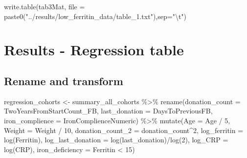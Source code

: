 \documentclass[
]{article}
\newenvironment{Shaded}{\begin{snugshade}}{\end{snugshade}}
\newcommand{\AttributeTok}[1]{\textcolor[rgb]{0.77,0.63,0.00}{#1}}
\newcommand{\DecValTok}[1]{\textcolor[rgb]{0.00,0.00,0.81}{#1}}
\newcommand{\FunctionTok}[1]{\textcolor[rgb]{0.00,0.00,0.00}{#1}}
\newcommand{\NormalTok}[1]{#1}
\newcommand{\OtherTok}[1]{\textcolor[rgb]{0.56,0.35,0.01}{#1}}
\newcommand{\SpecialCharTok}[1]{\textcolor[rgb]{0.00,0.00,0.00}{#1}}
\newcommand{\StringTok}[1]{\textcolor[rgb]{0.31,0.60,0.02}{#1}}
\begin{document}
\begin{Shaded}
\begin{Highlighting}[]
  \FunctionTok{write.table}\NormalTok{(tab3Mat, }
              \AttributeTok{file =} \FunctionTok{paste0}\NormalTok{(}\StringTok{"../results/low\_ferritin\_data/table\_1.txt"}\NormalTok{),}\AttributeTok{sep=}\StringTok{"}\SpecialCharTok{\textbackslash{}t}\StringTok{"}\NormalTok{)}
\end{Highlighting}
\end{Shaded}

\hypertarget{results---regression-table}{%
\section{Results - Regression table}\label{results---regression-table}}

\hypertarget{rename-and-transform}{%
\subsection{Rename and transform}\label{rename-and-transform}}

\begin{Shaded}
\begin{Highlighting}[]
\NormalTok{regression\_cohorts }\OtherTok{\textless{}{-}}\NormalTok{ summary\_all\_cohorts }\SpecialCharTok{\%\textgreater{}\%} 
    \FunctionTok{rename}\NormalTok{(}\AttributeTok{donation\_count =}\NormalTok{ TwoYearsFromStartCount\_FB,}
            \AttributeTok{last\_donation =}\NormalTok{ DaysToPreviousFB,}
            \AttributeTok{iron\_complience =}\NormalTok{ IronComplienceNumeric) }\SpecialCharTok{\%\textgreater{}\%} 
     \FunctionTok{mutate}\NormalTok{(}\AttributeTok{Age =}\NormalTok{ Age }\SpecialCharTok{/} \DecValTok{5}\NormalTok{, }
            \AttributeTok{Weight =}\NormalTok{ Weight }\SpecialCharTok{/} \DecValTok{10}\NormalTok{,}
            \AttributeTok{donation\_count\_2 =}\NormalTok{ donation\_count}\SpecialCharTok{\^{}}\DecValTok{2}\NormalTok{,}
            \AttributeTok{log\_ferritin =} \FunctionTok{log}\NormalTok{(Ferritin),}
            \AttributeTok{log\_last\_donation =} \FunctionTok{log}\NormalTok{(last\_donation)}\SpecialCharTok{/}\FunctionTok{log}\NormalTok{(}\DecValTok{2}\NormalTok{),}
            \AttributeTok{log\_CRP =} \FunctionTok{log}\NormalTok{(CRP),}
            \AttributeTok{iron\_deficiency =}\NormalTok{ Ferritin }\SpecialCharTok{\textless{}} \DecValTok{15}\NormalTok{) }
\end{Highlighting}
\end{Shaded}
\end{document}
